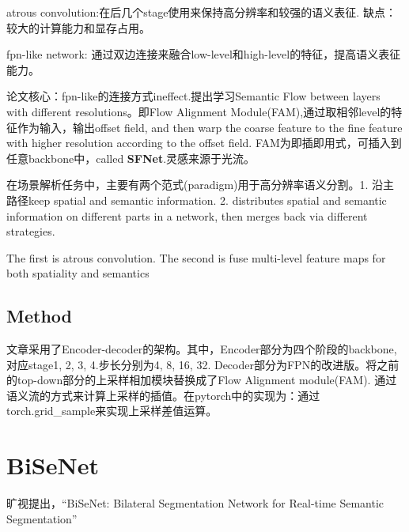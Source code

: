 \documentclass{article}
\begin{document}
atrous convolution:在后几个stage使用来保持高分辨率和较强的语义表征. 缺点：较大的计算能力和显存占用。

fpn-like network: 通过双边连接来融合low-level和high-level的特征，提高语义表征能力。

论文核心：fpn-like的连接方式ineffect.提出学习Semantic Flow between layers with different resolutions。即Flow Alignment Module(FAM),通过取相邻level的特征作为输入，输出offset field, and then warp the coarse feature to the fine feature with higher resolution according to the offset field. FAM为即插即用式，可插入到任意backbone中，called \textbf{SFNet}.灵感来源于光流。

在场景解析任务中，主要有两个范式(paradigm)用于高分辨率语义分割。1. 沿主路径keep spatial and semantic information. 2. distributes spatial and semantic information on different parts in a network, then merges back via different strategies.

The first is atrous convolution. The second is fuse multi-level feature maps for both spatiality and semantics

\subsection{Method}
文章采用了Encoder-decoder的架构。其中，Encoder部分为四个阶段的backbone,对应stage1, 2, 3, 4.步长分别为4, 8, 16, 32. Decoder部分为FPN的改进版。将之前的top-down部分的上采样相加模块替换成了Flow Alignment module(FAM). 通过语义流的方式来计算上采样的插值。在pytorch中的实现为：通过torch.grid{\_}sample来实现上采样差值运算。

\section{BiSeNet}
旷视提出，“BiSeNet: Bilateral Segmentation Network for Real-time Semantic Segmentation”
\end{document}

